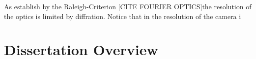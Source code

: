 As establish by the Raleigh-Criterion [CITE FOURIER OPTICS]the resolution of the optics is limited by diffration. Notice that in the resolution of the camera i

\section{Dissertation Overview}





%  
%

